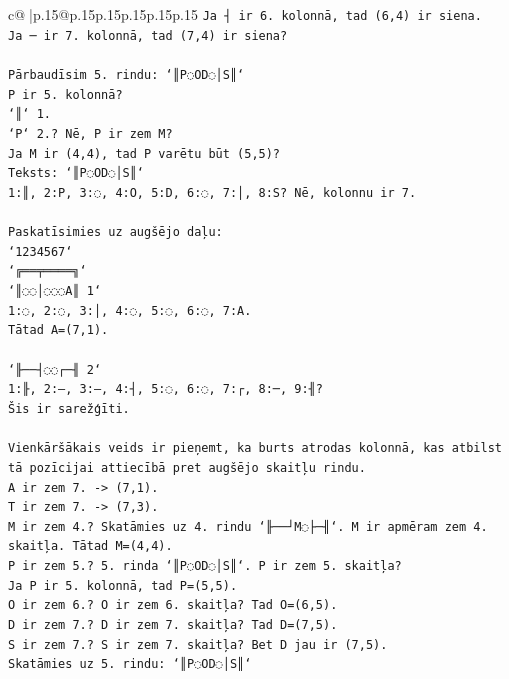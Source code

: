 \documentclass{article}
\begin{document}
{\begin{supertabular}{c@{$\;$}|p{.15\linewidth}@{}p{.15\linewidth}p{.15\linewidth}p{.15\linewidth}p{.15\linewidth}p{.15\linewidth}}
{{{\texttt{Ja ┤ ir 6. kolonnā, tad (6,4) ir siena.} \\
\texttt{Ja ─ ir 7. kolonnā, tad (7,4) ir siena?} \\
\\ 
\texttt{Pārbaudīsim 5. rindu: `║P◌OD◌│S║`} \\
\texttt{P ir 5. kolonnā?} \\
\texttt{`║` 1.} \\
\texttt{`P` 2.? Nē, P ir zem M?} \\
\texttt{Ja M ir (4,4), tad P varētu būt (5,5)?} \\
\texttt{Teksts: `║P◌OD◌│S║`} \\
\texttt{1:║, 2:P, 3:◌, 4:O, 5:D, 6:◌, 7:│, 8:S? Nē, kolonnu ir 7.} \\
\\ 
\texttt{Paskatīsimies uz augšējo daļu:} \\
\texttt{`1234567`} \\
\texttt{`╔══╤════╗`} \\
\texttt{`║◌◌│◌◌◌A║ 1`} \\
\texttt{1:◌, 2:◌, 3:│, 4:◌, 5:◌, 6:◌, 7:A.} \\
\texttt{Tātad A=(7,1).} \\
\\ 
\texttt{`╟──┤◌◌┌─╢ 2`} \\
\texttt{1:╟, 2:–, 3:–, 4:┤, 5:◌, 6:◌, 7:┌, 8:─, 9:╢?} \\
\texttt{Šis ir sarežģīti.} \\
\\ 
\texttt{Vienkāršākais veids ir pieņemt, ka burts atrodas kolonnā, kas atbilst tā pozīcijai attiecībā pret augšējo skaitļu rindu.} \\
\texttt{A ir zem 7. {-}> (7,1).} \\
\texttt{T ir zem 7. {-}> (7,3).} \\
\texttt{M ir zem 4.? Skatāmies uz 4. rindu `╟──┘M◌├─╢`. M ir apmēram zem 4. skaitļa. Tātad M=(4,4).} \\
\texttt{P ir zem 5.? 5. rinda `║P◌OD◌│S║`. P ir zem 5. skaitļa?} \\
\texttt{Ja P ir 5. kolonnā, tad P=(5,5).} \\
\texttt{O ir zem 6.? O ir zem 6. skaitļa? Tad O=(6,5).} \\
\texttt{D ir zem 7.? D ir zem 7. skaitļa? Tad D=(7,5).} \\
\texttt{S ir zem 7.? S ir zem 7. skaitļa? Bet D jau ir (7,5).} \\
\texttt{Skatāmies uz 5. rindu: `║P◌OD◌│S║`} \\
}}}
\end{supertabular}}
\end{document}
